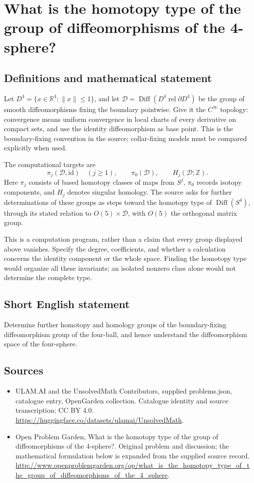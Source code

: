 \documentclass[11pt,a4paper]{article}
\begin{document}
\section*{What is the homotopy type of the group of diffeomorphisms of the 4-sphere?}\label{statement}

\subsection{Definitions and mathematical statement}
Let $D^4=\{x\in\mathbb R^4:\|x\|\le1\}$, and let
$\mathcal D=\operatorname{Diff}(D^4\operatorname{ rel}\partial D^4)$
be the group of smooth diffeomorphisms fixing the boundary pointwise.
Give it the $C^\infty$ topology: convergence means uniform convergence
in local charts of every derivative on compact sets, and use the
identity diffeomorphism as base point. This is the boundary-fixing
convention in the source; collar-fixing models must be compared
explicitly when used.

The computational targets are
\[
                 \pi_j(\mathcal D,\mathrm{id})\quad(j\ge1),
       \qquad \pi_0(\mathcal D),\qquad H_j(\mathcal D;\mathbb Z).
\]
Here $\pi_j$ consists of based homotopy classes of maps from $S^j$,
$\pi_0$ records isotopy components, and $H_j$ denotes singular homology.
The source asks for further determinations of these groups as steps
toward the homotopy type of $\operatorname{Diff}(S^4)$, through its
stated relation to $O(5)\times\mathcal D$, with $O(5)$ the orthogonal
matrix group.

This is a computation program, rather than a claim that every group
displayed above vanishes. Specify the degree, coefficients, and whether
a calculation concerns the identity component or the whole space.
Finding the homotopy type would organize all these invariants; an
isolated nonzero class alone would not determine the complete type.
\subsection{Short English statement}
Determine further homotopy and homology groups of the boundary-fixing diffeomorphism group of the four-ball, and hence understand the diffeomorphism space of the four-sphere.
\subsection{Sources}
\begin{itemize}
\item[S1] ULAM.AI and the UnsolvedMath Contributors, supplied problems.json, catalogue entry, OpenGarden collection. Catalogue identity and source transcription; CC BY 4.0.
\url{https://huggingface.co/datasets/ulamai/UnsolvedMath}.
\item[S2] Open Problem Garden, What is the homotopy type of the group of diffeomorphisms of the 4-sphere?. Original problem and discussion; the mathematical formulation below is expanded from the supplied source record.
\url{http://www.openproblemgarden.org/op/what_is_the_homotopy_type_of_the_group_of_diffeomorphisms_of_the_4_sphere}.
\end{itemize}
\end{document}
